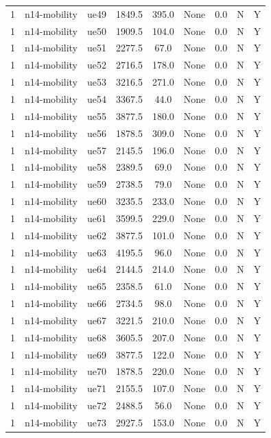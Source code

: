 \begin{table}[ht]
\begin{tabular}{|c|c|c|c|c|c|c|c|c|}
1 & n14-mobility & ue49 & 1849.5 & 395.0 & None & 0.0 & N & Y \\
1 & n14-mobility & ue50 & 1909.5 & 104.0 & None & 0.0 & N & Y \\
1 & n14-mobility & ue51 & 2277.5 & 67.0 & None & 0.0 & N & Y \\
1 & n14-mobility & ue52 & 2716.5 & 178.0 & None & 0.0 & N & Y \\
1 & n14-mobility & ue53 & 3216.5 & 271.0 & None & 0.0 & N & Y \\
1 & n14-mobility & ue54 & 3367.5 & 44.0 & None & 0.0 & N & Y \\
1 & n14-mobility & ue55 & 3877.5 & 180.0 & None & 0.0 & N & Y \\
1 & n14-mobility & ue56 & 1878.5 & 309.0 & None & 0.0 & N & Y \\
1 & n14-mobility & ue57 & 2145.5 & 196.0 & None & 0.0 & N & Y \\
1 & n14-mobility & ue58 & 2389.5 & 69.0 & None & 0.0 & N & Y \\
1 & n14-mobility & ue59 & 2738.5 & 79.0 & None & 0.0 & N & Y \\
1 & n14-mobility & ue60 & 3235.5 & 233.0 & None & 0.0 & N & Y \\
1 & n14-mobility & ue61 & 3599.5 & 229.0 & None & 0.0 & N & Y \\
1 & n14-mobility & ue62 & 3877.5 & 101.0 & None & 0.0 & N & Y \\
1 & n14-mobility & ue63 & 4195.5 & 96.0 & None & 0.0 & N & Y \\
1 & n14-mobility & ue64 & 2144.5 & 214.0 & None & 0.0 & N & Y \\
1 & n14-mobility & ue65 & 2358.5 & 61.0 & None & 0.0 & N & Y \\
1 & n14-mobility & ue66 & 2734.5 & 98.0 & None & 0.0 & N & Y \\
1 & n14-mobility & ue67 & 3221.5 & 210.0 & None & 0.0 & N & Y \\
1 & n14-mobility & ue68 & 3605.5 & 207.0 & None & 0.0 & N & Y \\
1 & n14-mobility & ue69 & 3877.5 & 122.0 & None & 0.0 & N & Y \\
1 & n14-mobility & ue70 & 1878.5 & 220.0 & None & 0.0 & N & Y \\
1 & n14-mobility & ue71 & 2155.5 & 107.0 & None & 0.0 & N & Y \\
1 & n14-mobility & ue72 & 2488.5 & 56.0 & None & 0.0 & N & Y \\
1 & n14-mobility & ue73 & 2927.5 & 153.0 & None & 0.0 & N & Y \\

\end{tabular}
\end{table}
